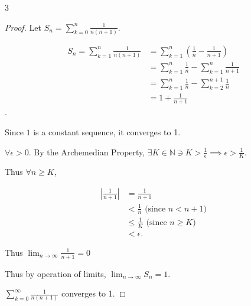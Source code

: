 \documentclass{article}
\newcommand{\N}{\mathbb{N}}
\newcommand{\abs}[1]{\left\lvert #1\right\rvert}
\begin{document}
\bigskip

\begin{PROB}{3}\label{Problem 3.}
\end{PROB}
\begin{proof}
    Let $S_n = \sum_{k = 0}^n \frac{1}{n(n + 1)}$.
    
    \begin{align*}
        S_n = \sum_{k = 1}^n \frac{1}{n(n + 1)} &= \sum_{k = 1}^n \left(\frac{1}{n} - \frac{1}{n + 1}\right) \\ 
        &= \sum_{k = 1}^n \frac{1}{n} - \sum_{k = 1}^n \frac{1}{n + 1} \\
        &= \sum_{k = 1}^n \frac{1}{n} - \sum_{k = 2}^{n+ 1} \frac{1}{n} \\
        &= 1 + \frac{1}{n + 1}
    \end{align*}.

    Since $1$ is a constant sequence, it converges to 1.
    
    $\forall \epsilon > 0$. By the Archemedian Property, $\exists K \in \N \ni K > \frac{1}{\epsilon} \implies \epsilon > \frac{1}{K}$. 
    
    Thus $\forall n \geq K$, 
    
    \begin{align*}
        \abs{\frac{1}{n + 1}} &= \frac{1}{n + 1} \\
        &< \frac{1}{n} \text{ (since $n < n + 1$)} \\
        &\leq \frac{1}{K} \text{ (since $n \geq K$)}\\
        &< \epsilon.
    \end{align*}

    Thus $\lim_{n \to \infty} \frac{1}{n + 1} = 0$ 
    

    Thus by operation of limits, $\lim_{n \to \infty} S_n = 1$. 
    
    $\sum_{k = 0}^\infty \frac{1}{n(n + 1)}$ converges to 1. 
\end{proof}

\bigskip
\end{document}
